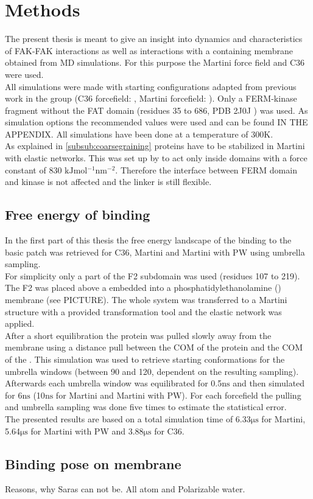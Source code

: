 \section{Methods}
The present thesis is meant to give an insight into dynamics and characteristics of FAK-FAK interactions as well as interactions with a \pip{} containing membrane obtained from MD simulations. For this purpose the Martini force field and C36 were used.\\
All simulations were made with starting configurations adapted from previous work in the group (C36 forcefield: \textcite{pap003}, Martini forcefield: \textcite{SARA}). Only a FERM-kinase fragment without the FAT domain (residues 35 to 686, PDB 2J0J \autocite{structFAK}) was used. As simulation options the recommended values were used and can be found IN THE APPENDIX. All simulations have been done at a temperature of 300$\si{\kelvin}$.\\
As explained in \autoref{subsub:coarsegraining} proteins have to be stabilized in Martini with elastic networks. This was set up by \textcite{SARA} to act only inside domains with a force constant of 830 $\si{\kilo\joule\mole^{-1}\nano\meter^{-2}}$. Therefore the interface between FERM domain and kinase is not affected and the linker is still flexible.
\subsection{Free energy of \pip{} binding}
In the first part of this thesis the free energy landscape of the \pip{} binding to the basic patch was retrieved for C36, Martini and Martini with PW using umbrella sampling.\\
For simplicity only a part of the F2 subdomain was used (residues 107 to 219). The F2 was placed above a \pip{} embedded into a phosphatidylethanolamine (\pope{}) membrane (see PICTURE). The whole system was transferred to a Martini structure with a provided transformation tool \autocite{backwardpy} and the elastic network was applied.\\
After a short equilibration the protein was pulled slowly away from the membrane using a distance pull between the COM of the protein and the COM of the \pip{}. This simulation was used to retrieve starting conformations for the umbrella windows (between 90 and 120, dependent on the resulting sampling). Afterwards each umbrella window was equilibrated for 0.5$\si{\nano\second}$ and then simulated for 6$\si{\nano\second}$ (10$\si{\nano\second}$ for Martini and Martini with PW). For each forcefield the pulling and umbrella sampling was done five times to estimate the statistical error.\\
The presented results are based on a total simulation time of 6.33$\si{\micro\second}$ for Martini, 5.64$\si{\micro\second}$ for Martini with PW and 3.88$\si{\micro\second}$ for C36. %
\subsection{Binding pose on membrane}
Reasons, why Saras can not be.
All atom and Polarizable water.
